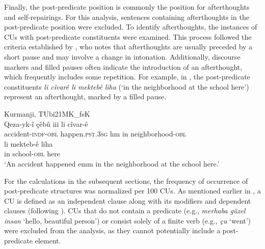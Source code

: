 Finally, the post-predicate position is commonly the position for afterthoughts and self-repairings. For this analysis, sentences containing afterthoughts in the post-predicate position were excluded. To identify afterthoughts, the instances of CUs with post-predicate constituents were examined. This process followed the criteria established by \citet{Erguvanli1984}, who notes that afterthoughts are usually preceded by a short pause and may involve a change in intonation. Additionally, discourse markers and filled pauses often indicate the introduction of an afterthought, which frequently includes some repetition. For example, in , the post-predicate constituents \textit{li cîvarê li mektebê liha} (‘in the neighborhood at the school here’) represent an afterthought, marked by a filled pause.

\ea \label{ex:key:37} Kurmanji, TUbi21MK\_fsK\\
\gll Qeza-yk-î     çêbû       iii   li   cîvar-ê \\
accident-\textsc{indf}-\textsc{obl}  happen\textsc{.pst.3sg}  hm  in   neighborhood-\textsc{obl}\\
\gll li   mekteb-ê   liha\\
in  school-\textsc{obl}  here\\
\glt ‘An accident happened emm in the neighborhood at the school here.’ 
\z

For the calculations in the subsequent sections, the frequency of occurrence of post-predicate structures was normalized per 100 CUs. As mentioned earlier in , a CU is defined as an independent clause along with its modifiers and dependent clauses (following \citealt{Loban1976}). CUs that do not contain a predicate (e.g., \textit{merhaba güzel insan} ‘hello, beautiful person’) or consist solely of a finite verb (e.g., \textit{çu} ‘went’) were excluded from the analysis, as they cannot potentially include a post-predicate element.

